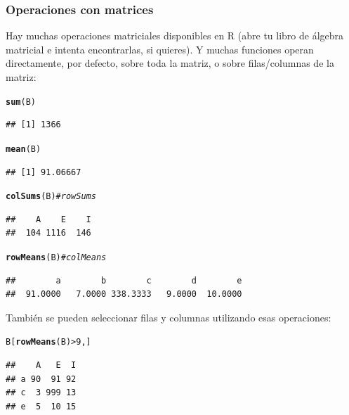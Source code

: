 \documentclass{config/apuntes}\usepackage[]{graphicx}\usepackage[]{xcolor}
\makeatletter
\newcommand{\hlnum}[1]{\textcolor[rgb]{0.686,0.059,0.569}{#1}}%
\newcommand{\hlcom}[1]{\textcolor[rgb]{0.678,0.584,0.686}{\textit{#1}}}%
\newcommand{\hlopt}[1]{\textcolor[rgb]{0,0,0}{#1}}%
\newcommand{\hldef}[1]{\textcolor[rgb]{0.345,0.345,0.345}{#1}}%
\newcommand{\hlkwd}[1]{\textcolor[rgb]{0.737,0.353,0.396}{\textbf{#1}}}%
\newenvironment{kframe}{%
 \def\at@end@of@kframe{}%
 \ifinner\ifhmode%
  \def\at@end@of@kframe{\end{minipage}}%
  \begin{minipage}{\columnwidth}%
 \fi\fi%
 \def\FrameCommand##1{\hskip\@totalleftmargin \hskip-\fboxsep
 \colorbox{shadecolor}{##1}\hskip-\fboxsep
     \hskip-\linewidth \hskip-\@totalleftmargin \hskip\columnwidth}%
 \MakeFramed {\advance\hsize-\width
   \@totalleftmargin\z@ \linewidth\hsize
   \@setminipage}}%
 {\par\unskip\endMakeFramed%
 \at@end@of@kframe}
\newenvironment{knitrout}{}{} %
\makeatother
\begin{document}
\subsubsection{Operaciones con matrices}
Hay muchas operaciones matriciales disponibles en R (abre tu libro de álgebra matricial e intenta encontrarlas, si quieres). Y muchas funciones operan directamente, por defecto, sobre toda la matriz, o sobre filas/columnas de la matriz:
\begin{knitrout}
\color{fgcolor}\begin{kframe}
\begin{alltt}
\hlkwd{sum}\hldef{(B)}
\end{alltt}
\begin{verbatim}
## [1] 1366
\end{verbatim}
\begin{alltt}
\hlkwd{mean}\hldef{(B)}
\end{alltt}
\begin{verbatim}
## [1] 91.06667
\end{verbatim}
\begin{alltt}
\hlkwd{colSums}\hldef{(B)} \hlcom{#rowSums}
\end{alltt}
\begin{verbatim}
##    A    E    I 
##  104 1116  146
\end{verbatim}
\begin{alltt}
\hlkwd{rowMeans}\hldef{(B)} \hlcom{#colMeans }
\end{alltt}
\begin{verbatim}
##        a        b        c        d        e 
##  91.0000   7.0000 338.3333   9.0000  10.0000
\end{verbatim}
\end{kframe}
\end{knitrout}

También se pueden seleccionar filas y columnas utilizando esas operaciones:
\begin{knitrout}
\color{fgcolor}\begin{kframe}
\begin{alltt}
\hldef{B[}\hlkwd{rowMeans}\hldef{(B)} \hlopt{>} \hlnum{9}\hldef{, ]}
\end{alltt}
\begin{verbatim}
##    A   E  I
## a 90  91 92
## c  3 999 13
## e  5  10 15
\end{verbatim}
\end{kframe}
\end{knitrout}
\end{document}
